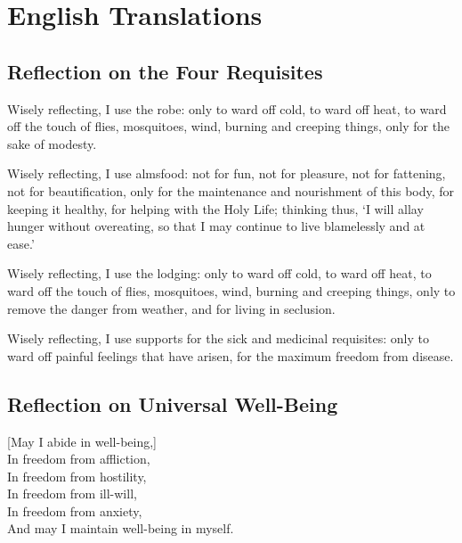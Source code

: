 \chapter{English Translations}

\section{Reflection on the Four Requisites}


Wisely reflecting, I use the robe: only to ward off cold, to ward off heat, to ward off the touch of flies, mosquitoes, wind, burning and creeping things, only for the sake of modesty.

Wisely reflecting, I use almsfood: not for fun, not for pleasure, not for fattening, not for beautification, only for the maintenance and nourishment of this body, for keeping it healthy, for helping with the Holy Life; thinking thus, `I will allay hunger without overeating, so that I may continue to live blamelessly and at ease.'

Wisely reflecting, I use the lodging: only to ward off cold, to ward off heat, to ward off the touch of flies, mosquitoes, wind, burning and creeping things, only to remove the danger from weather, and for living in seclusion.

Wisely reflecting, I use supports for the sick and medicinal requisites: only to ward off painful feelings that have arisen, for the maximum freedom from disease.


\section{Reflection on Universal Well-Being}

\begin{leader}
\end{leader}


[May I abide in well-being,]\\
In freedom from affliction,\\
In freedom from hostility,\\
In freedom from ill-will,\\
In freedom from anxiety,\\
And may I maintain well-being in myself.

